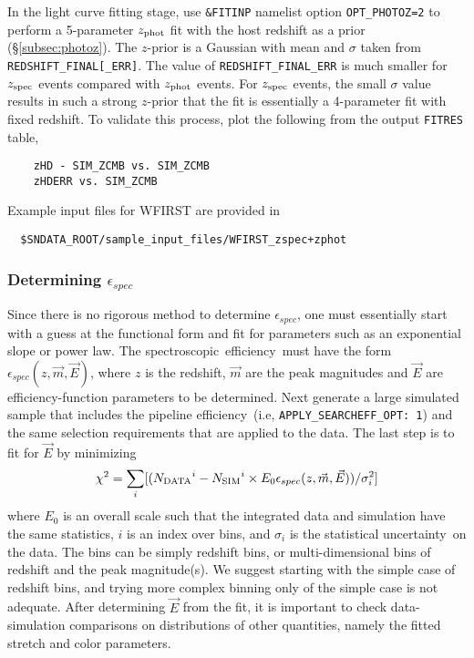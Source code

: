 \documentclass[12pt]{article}
\newcommand{\unc}{uncertainty}
\newcommand{\Zphot}{z_{\rm phot}}
\newcommand{\Zspec}{z_{\rm spec}}
\newcommand{\eff}{efficiency}
\newcommand{\simeffspec}{\epsilon_{spec}}
\newcommand{\spec}{spectroscopic}
\begin{document}
{In the light curve fitting stage, use {\tt \&FITINP} namelist option  {\tt OPT\_PHOTOZ=2}
to perform a  5-parameter $\Zphot$ fit with the host redshift as a prior (\S\ref{subsec:photoz}).
The $z$-prior is a Gaussian with mean and $\sigma$ taken from {\tt REDSHIFT\_FINAL[\_ERR]}. 
The value of  {\tt REDSHIFT\_FINAL\_ERR} is much smaller for $\Zspec$
events compared with $\Zphot$ events. For $\Zspec$ events, the small $\sigma$ value
results in such a strong $z$-prior that the fit is essentially a 4-parameter fit with fixed redshift.
To validate this process, plot the following
from the output {\tt FITRES} table,
\begin{Verbatim}
    zHD - SIM_ZCMB vs. SIM_ZCMB
    zHDERR vs. SIM_ZCMB
\end{Verbatim}

\medskip
\noindent Example input files for WFIRST are provided in
\vspace{-0.2cm}
\begin{Verbatim}
  $SNDATA_ROOT/sample_input_files/WFIRST_zspec+zphot 
\end{Verbatim}

   \subsubsection{Determining $\simeffspec$}
   \label{sssec:simeffspec}

\newcommand{\Ndata}{N_{\rm DATA}}
\newcommand{\Nsim}{N_{\rm SIM}}

Since there is no rigorous method to determine $\simeffspec$,
one must essentially start with a guess at the functional 
form and fit for parameters such as an exponential slope or power law.
The \spec\ \eff\ must have the form
$\simeffspec(z,\vec{m},\vec{E})$, where 
$z$ is the redshift, $\vec{m}$ are the peak magnitudes and 
$\vec{E}$ are \eff-function parameters
to be determined. Next generate a large simulated
sample that includes the pipeline \eff\
(i.e, {\tt APPLY\_SEARCHEFF\_OPT: 1}) and the same
selection requirements that are applied to the data.
The last step is to fit for $\vec{E}$ by minimizing
\begin{equation}
   \chi^2 = \sum_i  
  [( {\Ndata}^i - 
   {\Nsim}^i \times E_0\simeffspec(z,\vec{m},\vec{E}) )/\sigma_i^2 ]
\end{equation}
% 
where $E_0$ is an overall scale such that
the integrated data and simulation have the same
statistics, $i$ is an index over bins,
and $\sigma_i$ is the statistical \unc\ on the data.
The bins can be simply redshift bins, 
or multi-dimensional bins of redshift and the peak magnitude(s).
We suggest starting with the simple case of redshift bins,
and trying more complex binning only of the simple case
is not adequate. After determining $\vec{E}$ from the fit,
it is important to check data-simulation comparisons
on distributions of other quantities, namely the
fitted stretch and color parameters.


}
\end{document}
